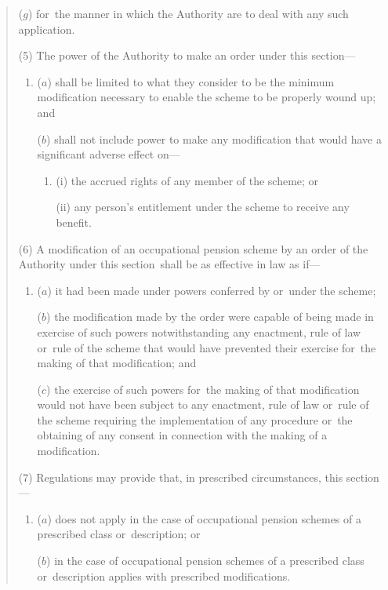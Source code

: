 \documentclass[12pt,a4paper]{article}
\begin{document}
\begin{quotation}
\begin{enumerate}
($g$) for~the manner in which the Authority are to deal with any such application.
\end{enumerate}

(5) The power of the Authority to make an order under this section—
\begin{enumerate}\item[]
($a$) shall be limited to what they consider to be the minimum modification necessary to enable the scheme to be properly wound up; and

($b$) shall not include power to make any modification that would have a significant adverse effect on—
\begin{enumerate}\item[]
(i) the accrued rights of any member of the scheme; or

(ii) any person’s entitlement under the scheme to receive any benefit.
\end{enumerate}
\end{enumerate}

(6) A modification of an occupational pension scheme by an order of the Authority under this section~shall be as effective in law as if—
\begin{enumerate}\item[]
($a$) it had been made under powers conferred by or~under the scheme;

($b$) the modification made by the order were capable of being made in exercise of such powers notwithstanding any enactment, rule of law or~rule of the scheme that would have prevented their exercise for~the making of that modification; and

($c$) the exercise of such powers for~the making of that modification would not have been subject to any enactment, rule of law or~rule of the scheme requiring the implementation of any procedure or~the obtaining of any consent in connection with the making of a modification.
\end{enumerate}

(7) Regulations may provide that, in prescribed circumstances, this section—
\begin{enumerate}\item[]
($a$) does not apply in the case of occupational pension schemes of a prescribed class or~description; or

($b$) in the case of occupational pension schemes of a prescribed class or~description applies with prescribed modifications.
\end{enumerate}


\end{quotation}
\end{document}
